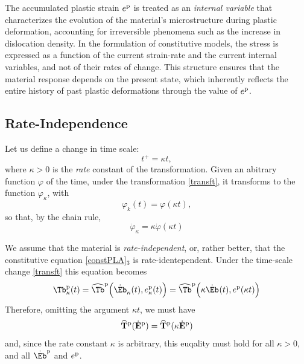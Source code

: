 \begin{remark}
 The accumulated plastic strain  \( e^{\rm p} \) is treated as an \textit{ internal variable} that characterizes the evolution of the material’s microstructure during plastic deformation, accounting for irreversible phenomena such as the increase in dislocation density. In the formulation of constitutive models, the stress is expressed as a function of the current strain-rate and the current internal variables, and not of their rates of change. This structure ensures that the material response depends on the present state, which inherently reflects the entire history of past plastic deformations through the value of  \( e^{\rm p} \).
\end{remark}

\subsection{Rate-Independence}
Let us define a change in time scale:
\begin{equation}\label{transft}
	t^+=\kappa t,
\end{equation}
where $\kappa>0$ is the \textit{rate} constant of the transformation. Given an abitrary function $\varphi$ of the time, under the transformation \eqref{transft}, it transforms to the function $\varphi_\kappa$, with
\begin{equation}
\varphi_k(t)=\varphi(\kappa t),
\end{equation}
so that, by the chain rule,
\begin{equation}
\dot \varphi_\kappa=\kappa \dot\varphi(\kappa t)
\end{equation}

We assume that the material is \textit{rate-independent}, or, rather better, that the constitutive equation \eqref{constPLA}$_3$ is rate-identependent. Under the time-scale change \eqref{transft} this equation becomes
\begin{equation}
\Tb^{\rm p}_\kappa(t)=\widehat{\Tb}^{\rm p}\Big(\dot\Eb_\kappa^{\rm}(t), e_\kappa^{\rm p}(t)  \Big)=\widehat{\Tb}^{\rm p}\Big(\kappa\dot\Eb^{\rm}(t), e^{\rm p}(\kappa t)  \Big)
\end{equation}
Therefore, omitting the argument $\kappa t$, we must have
\begin{equation}\label{ratind}
 \widehat{\mathbf{T}}^{\rm p}(\dot{\mathbf{E}}^{\rm p})= \widehat{\mathbf{T}}^{\rm p}(\kappa\dot{\mathbf{E}}^{\rm p})
\end{equation}
and, since the rate constant $\kappa$ is arbitrary, this euqality must hold for all $\kappa>0$, and all $\dot{\Eb}^{\rm p}$ and $e^{\rm p}$.

